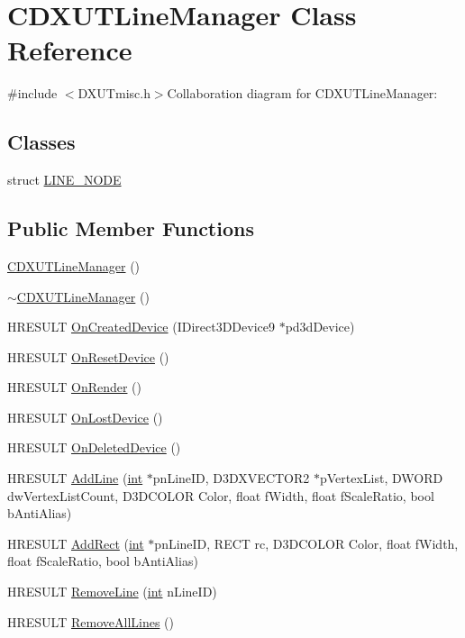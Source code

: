 \hypertarget{class_c_d_x_u_t_line_manager}{
\section{CDXUTLineManager Class Reference}
\label{class_c_d_x_u_t_line_manager}
}


{\ttfamily \#include $<$DXUTmisc.h$>$}Collaboration diagram for CDXUTLineManager:\subsection*{Classes}
\begin{DoxyCompactItemize}
\item 
struct \hyperlink{struct_c_d_x_u_t_line_manager_1_1_l_i_n_e___n_o_d_e}{LINE\_\-NODE}
\end{DoxyCompactItemize}
\subsection*{Public Member Functions}
\begin{DoxyCompactItemize}
\item 
\hyperlink{class_c_d_x_u_t_line_manager_a81d134fec2bd2c9944bdea59b61d311b}{CDXUTLineManager} ()
\item 
\hyperlink{class_c_d_x_u_t_line_manager_a47573159d45aaf222cd31bcc192308fe}{$\sim$CDXUTLineManager} ()
\item 
HRESULT \hyperlink{class_c_d_x_u_t_line_manager_ae5dc0839102d2daa1193f3c377af0833}{OnCreatedDevice} (IDirect3DDevice9 $\ast$pd3dDevice)
\item 
HRESULT \hyperlink{class_c_d_x_u_t_line_manager_af0a79d23ae9c18275b57c59c36828ca8}{OnResetDevice} ()
\item 
HRESULT \hyperlink{class_c_d_x_u_t_line_manager_a7bac9b5284fe576db806cba8423b2eda}{OnRender} ()
\item 
HRESULT \hyperlink{class_c_d_x_u_t_line_manager_a609fbd2215c2c4fbb02bf42d98686346}{OnLostDevice} ()
\item 
HRESULT \hyperlink{class_c_d_x_u_t_line_manager_a4ad6b10373fe6179783f3805379643c4}{OnDeletedDevice} ()
\item 
HRESULT \hyperlink{class_c_d_x_u_t_line_manager_a943c26c0d740ebcb58e24b1a8f8c70de}{AddLine} (\hyperlink{_d_x_u_tgui_8cpp_a2d77ed03302b6978834ee3b6f57837fb}{int} $\ast$pnLineID, D3DXVECTOR2 $\ast$pVertexList, DWORD dwVertexListCount, D3DCOLOR Color, float fWidth, float fScaleRatio, bool bAntiAlias)
\item 
HRESULT \hyperlink{class_c_d_x_u_t_line_manager_ab6a0ff03d7acdabd30ff92c92e696b65}{AddRect} (\hyperlink{_d_x_u_tgui_8cpp_a2d77ed03302b6978834ee3b6f57837fb}{int} $\ast$pnLineID, RECT rc, D3DCOLOR Color, float fWidth, float fScaleRatio, bool bAntiAlias)
\item 
HRESULT \hyperlink{class_c_d_x_u_t_line_manager_aabb8acc5fc21c6a283575031fe49ed90}{RemoveLine} (\hyperlink{_d_x_u_tgui_8cpp_a2d77ed03302b6978834ee3b6f57837fb}{int} nLineID)
\item 
HRESULT \hyperlink{class_c_d_x_u_t_line_manager_ad07600de77c719bb97f1ee004387d241}{RemoveAllLines} ()
\end{DoxyCompactItemize}
